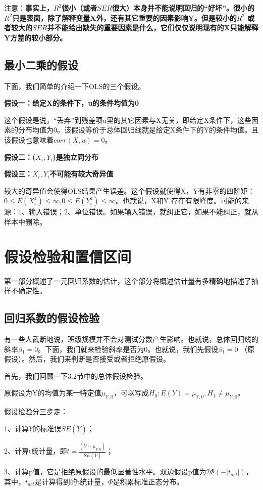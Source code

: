 \documentclass[cn,10pt,math=newtx,citestyle=gb7714-2015,bibstyle=gb7714-2015]{elegantbook}
\begin{document}
	注意：\textbf{事实上，$R^2$很小（或者$SER$很大）本身并不能说明回归的“好坏”。很小的$R^2$只是表面，除了解释变量X外，还有其它重要的因素影响Y。但是较小的$R^2$ 或者较大的$SER$并不能给出缺失的重要因素是什么，它们仅仅说明现有的X只能解释Y方差的较小部分。}
	
	\subsection{最小二乘的假设}
	下面，我们简单的介绍一下OLS的三个假设。
	
	\textbf{假设一：给定X的条件下，u的条件均值为0}
	
	这个假设是说，“丢弃”到残差项u里的其它因素与X无关，即给定X条件下，这些因素的分布均值为0。该假设等价于总体回归线就是给定X条件下的Y的条件均值。且该假设也意味着$corr(X,u)=0$。
	
	\textbf{假设二：($X_i,Y_i$)是独立同分布}
	
	\textbf{假设三：$X_i,Y_i$不可能有较大奇异值}
	
	较大的奇异值会使得OLS结果产生误差。这个假设就使得X，Y有非零的四阶矩：$0\leq{E(X_i^4)}\leq\infty$,$0\leq{E(Y_i^4)}\leq\infty$。也就说，X和Y 存在有限峰度。可能的来源：1、输入错误；2、单位错误。如果输入错误，就纠正它，如果不能纠正，就从样本中删除。
	
	\section{假设检验和置信区间}
	第一部分概述了一元回归系数的估计，这个部分将概述估计量有多精确地描述了抽样不确定性。
	
	\subsection{回归系数的假设检验}
	有一些人武断地说，班级规模并不会对测试分数产生影响。也就说，总体回归线的斜率$\beta{_1}=0$。下面，我们就来检验斜率是否为0。也就说，我们先假设$\beta{_1}=0$ （原假设）。然后，我们来判断是否接受或者拒绝原假设。
	
	首先，我们回顾一下3.2节中的总体假设检验。
	
	原假设为Y的均值为某一特定值$\mu_{Y,0}$，可以写成$H_0:E(Y)=\mu_{Y,0},H_1\neq\mu_{Y,0}$。
	
	假设检验分三步走：
	
	1、计算$\overline{Y}$的标准误$SE(\overline{Y})$；
	
	2、计算t统计量，即$t=\frac{(\overline{Y}-\mu_{Y,0})}{SE(\overline{Y})}$；
	
	3、计算p值，它是拒绝原假设的最低显著性水平。双边假设p值为$2\Phi{(-|t_{act}|)}$，其中，$t_{act}$是计算得到的t统计量，$\Phi$是积累标准正态分布。
	
\end{document}
